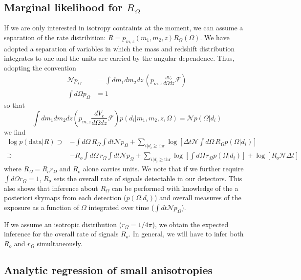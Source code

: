 \documentclass{article}
\begin{document}
\subsection*{Marginal likelihood for $R_\Omega$}

If we are only interested in isotropy contraints at the moment, we can assume a separation of the rate distribition: $R = p_{m,z}(m_1, m_2, z) R_\Omega(\Omega)$.
We have adopted a separation of variables in which the mass and redshift distribution integrates to one and the units are carried by the angular dependence.
Thus, adopting the convention
\begin{align}
    \mathcal{N} p_\Omega & = \int dm_1 dm_2 dz\, \left(p_{m,z} \frac{dV_c}{d\Omega dz} \mathcal{F}\right) \\
    \int d\Omega p_\Omega & = 1
\end{align}
so that
\begin{equation}
    \int dm_1 dm_2 dz \left( p_{m,z}\frac{dV_c}{d\Omega dz} \mathcal{F}\right) p(d_i|m_1, m_2, z, \Omega) = \mathcal{N} p(\Omega|d_i)
\end{equation}
we find
\begin{align}
    \log p(\mathrm{data}|R) \supset & - \int d\Omega\, R_\Omega \int dt \mathcal{N} p_\Omega + \sum\limits_{i|d_i\geq\mathrm{thr}} \log \left[ \Delta t \mathcal{N} \int d\Omega\, R_\Omega p(\Omega|d_i) \right] \\
                            \supset & - R_o \int d\Omega\, r_\Omega \int dt \mathcal{N} p_\Omega + \sum\limits_{i|d_i\geq\mathrm{thr}} \log \left[ \int d\Omega\, r_\Omega p(\Omega|d_i) \right] + \log\left[ R_o \mathcal{N} \Delta t \right]
\end{align}
where $R_\Omega = R_o r_\Omega$ and $R_o$ alone carries units.
We note that if we further require $\int d\Omega r_\Omega = 1$, $R_o$ sets the overall rate of signals detectable in our detectors.
This also shows that inference about $R_\Omega$ can be performed with knowledge of the a posteriori skymaps from each detection ($p(\Omega|d_i)$) and overall measures of the exposure as a function of $\Omega$ integrated over time ($\int dt \mathcal{N} p_\Omega$).

If we assume an isotropic distribution ($r_\Omega = 1/4\pi$), we obtain the expected inference for the overall rate of signals $R_o$.
In general, we will have to infer both $R_o$ and $r_\Omega$ simultaneously.



\subsection*{Analytic regression of small anisotropies}
\end{document}
